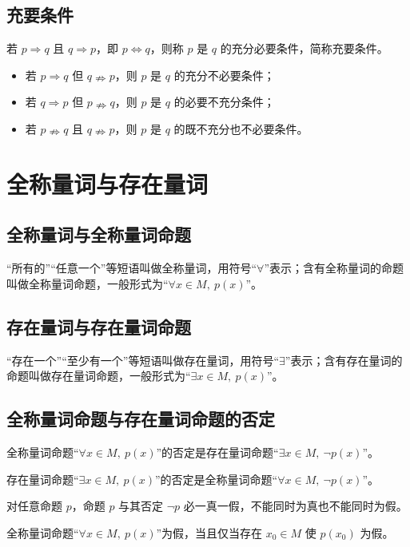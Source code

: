 \documentclass[lang=cn,newtx,10pt,scheme=chinese,nofont]{elegantbook}
\begin{document}
\subsection{充要条件}
\begin{definition}[充要条件]
若 $p \Rightarrow q$ 且 $q \Rightarrow p$，即 $p \Leftrightarrow q$，则称 $p$ 是 $q$ 的充分必要条件，简称充要条件。
\end{definition}
\begin{definition}
\begin{itemize}
    \item 若 $p \Rightarrow q$ 但 $q \nRightarrow p$，则 $p$ 是 $q$ 的充分不必要条件；
    \item 若 $q \Rightarrow p$ 但 $p \nRightarrow q$，则 $p$ 是 $q$ 的必要不充分条件；
    \item 若 $p \nRightarrow q$ 且 $q \nRightarrow p$，则 $p$ 是 $q$ 的既不充分也不必要条件。
\end{itemize}
\end{definition}

\section{全称量词与存在量词}
\subsection{全称量词与全称量词命题}
\begin{definition}[全称量词与全称量词命题]
“所有的”“任意一个”等短语叫做全称量词，用符号“$\forall$”表示；含有全称量词的命题叫做全称量词命题，一般形式为“$\forall x \in M,\ p(x)$”。
\end{definition}
\subsection{存在量词与存在量词命题}
\begin{definition}[存在量词与存在量词命题]
“存在一个”“至少有一个”等短语叫做存在量词，用符号“$\exists$”表示；含有存在量词的命题叫做存在量词命题，一般形式为“$\exists x \in M,\ p(x)$”。
\end{definition}
\subsection{全称量词命题与存在量词命题的否定}
\begin{definition}[全称量词命题的否定]
全称量词命题“$\forall x \in M,\ p(x)$”的否定是存在量词命题“$\exists x \in M,\ \neg p(x)$”。
\end{definition}
\begin{definition}[存在量词命题的否定]
存在量词命题“$\exists x \in M,\ p(x)$”的否定是全称量词命题“$\forall x \in M,\ \neg p(x)$”。
\end{definition}
\begin{theorem}[命题与其否定]
对任意命题 $p$，命题 $p$ 与其否定 $\neg p$ 必一真一假，不能同时为真也不能同时为假。
\end{theorem}
\begin{corollary}[全称量词命题为假的判定]
全称量词命题“$\forall x \in M,\ p(x)$”为假，当且仅当存在 $x_0 \in M$ 使 $p(x_0)$ 为假。
\end{corollary}
\end{document}
